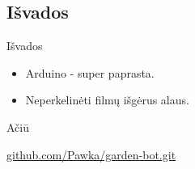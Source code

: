 \documentclass[12pt,a4paper]{beamer}
\begin{document}
\subsection{Išvados}
\begin{frame}{Išvados}
    \begin{itemize}
        \item Arduino - super paprasta.
        \item Neperkelinėti filmų išgėrus alaus.
    \end{itemize}
\end{frame}

\begin{frame}
	\begin{center}
        {\Huge Ačiū}
	\end{center}
    \begin{center}
        \href{http://github.com/Pawka/garden-bot.git}{github.com/Pawka/garden-bot.git}
    \end{center}
\end{frame}
\end{document}
